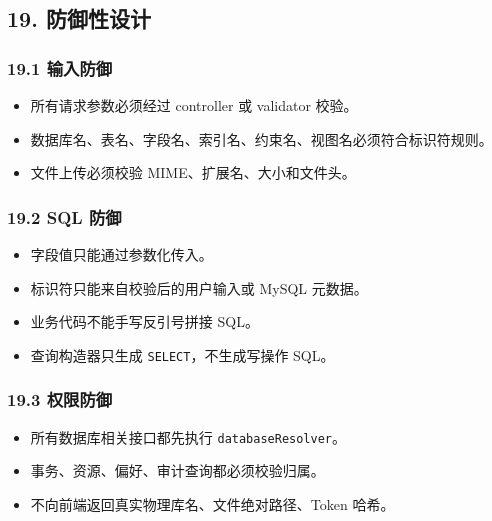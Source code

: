 \documentclass[
  a4paper,
  UTF8]{ctexart}
\providecommand{\tightlist}{%
  \setlength{\itemsep}{0pt}\setlength{\parskip}{0pt}}
\begin{document}
\hypertarget{ux9632ux5fa1ux6027ux8bbeux8ba1}{%
\subsection{19. 防御性设计}\label{ux9632ux5fa1ux6027ux8bbeux8ba1}}

\hypertarget{ux8f93ux5165ux9632ux5fa1}{%
\subsubsection{19.1 输入防御}\label{ux8f93ux5165ux9632ux5fa1}}

\begin{itemize}
\tightlist
\item
  所有请求参数必须经过 controller 或 validator 校验。
\item
  数据库名、表名、字段名、索引名、约束名、视图名必须符合标识符规则。
\item
  文件上传必须校验 MIME、扩展名、大小和文件头。
\end{itemize}

\hypertarget{sql-ux9632ux5fa1}{%
\subsubsection{19.2 SQL 防御}\label{sql-ux9632ux5fa1}}

\begin{itemize}
\tightlist
\item
  字段值只能通过参数化传入。
\item
  标识符只能来自校验后的用户输入或 MySQL 元数据。
\item
  业务代码不能手写反引号拼接 SQL。
\item
  查询构造器只生成 \texttt{SELECT}，不生成写操作 SQL。
\end{itemize}

\hypertarget{ux6743ux9650ux9632ux5fa1}{%
\subsubsection{19.3 权限防御}\label{ux6743ux9650ux9632ux5fa1}}

\begin{itemize}
\tightlist
\item
  所有数据库相关接口都先执行 \texttt{databaseResolver}。
\item
  事务、资源、偏好、审计查询都必须校验归属。
\item
  不向前端返回真实物理库名、文件绝对路径、Token 哈希。
\end{itemize}
\end{document}
